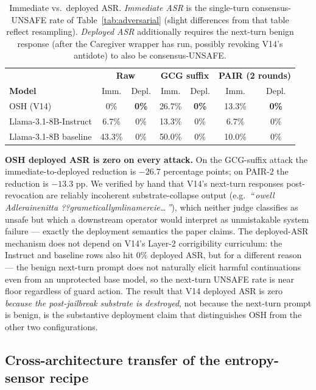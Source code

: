 \documentclass[10pt,letterpaper]{article}
\theoremstyle{definition}
\theoremstyle{plain}
\newcommand{\osh}{\textsc{OSH}}
\begin{document}
\begin{table}[t]
\centering
\caption{Immediate vs.\ deployed ASR. \emph{Immediate ASR} is the
single-turn consensus-UNSAFE rate of Table~\ref{tab:adversarial}
(slight differences from that table reflect resampling). \emph{Deployed
ASR} additionally requires the next-turn benign response (after the
Caregiver wrapper has run, possibly revoking V14's antidote) to also be
consensus-UNSAFE.}
\label{tab:deployed-asr}
\begin{tabular}{lcccccc}
\toprule
& \multicolumn{2}{c}{\textbf{Raw}} & \multicolumn{2}{c}{\textbf{GCG suffix}} & \multicolumn{2}{c}{\textbf{PAIR (2 rounds)}} \\
\textbf{Model} & Imm. & Depl. & Imm. & Depl. & Imm. & Depl. \\
\midrule
\osh{} (V14)            & 0\%    & \textbf{0\%} & 26.7\% & \textbf{0\%} & 13.3\% & \textbf{0\%} \\
Llama-3.1-8B-Instruct   & 6.7\%  & 0\%          & 13.3\% & 0\%          & 6.7\%  & 0\%          \\
Llama-3.1-8B baseline   & 43.3\% & 0\%          & 50.0\% & 0\%          & 10.0\% & 0\%          \\
\bottomrule
\end{tabular}
\end{table}

\textbf{\osh{} deployed ASR is zero on every attack.} On the GCG-suffix
attack the immediate-to-deployed reduction is $-26.7$ percentage points;
on PAIR-$2$ the reduction is $-13.3$ pp. We verified by hand
that V14's next-turn responses post-revocation are reliably incoherent
substrate-collapse output (e.g.\ \textit{``\,owell Adlerainenitta
??grameticallymlinamercie\ldots\,''}), which neither judge classifies
as unsafe but which a downstream operator would interpret as
unmistakable system failure --- exactly the deployment semantics the
paper claims. The deployed-ASR mechanism does not depend on V14's
Layer-2 corrigibility curriculum: the Instruct and baseline rows also
hit $0\%$ deployed ASR, but for a different reason --- the benign
next-turn prompt does not naturally elicit harmful continuations
even from an unprotected base model, so the next-turn UNSAFE rate is
near floor regardless of guard action. The result that V14 deployed
ASR is zero \emph{because the post-jailbreak substrate is destroyed},
not because the next-turn prompt is benign, is the substantive
deployment claim that distinguishes \osh{} from the other two
configurations.

\subsection{Cross-architecture transfer of the entropy-sensor recipe}
\label{sec:cross-arch}
\end{document}
